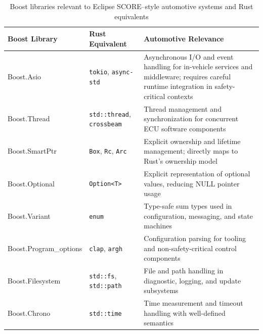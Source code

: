         \begin{table}[h!]
        \centering
        \begin{tabular}{|l|l|p{6cm}|}
        \hline
        \textbf{Boost Library} & \textbf{Rust Equivalent} & \textbf{Automotive Relevance} \\ \hline

        Boost.Asio &
        \texttt{tokio}, \texttt{async-std} &
        Asynchronous I/O and event handling for in-vehicle services and middleware; requires careful runtime integration in safety-critical contexts \\ \hline

        Boost.Thread &
        \texttt{std::thread}, \texttt{crossbeam} &
        Thread management and synchronization for concurrent ECU software components \\ \hline

        Boost.SmartPtr &
        \texttt{Box}, \texttt{Rc}, \texttt{Arc} &
        Explicit ownership and lifetime management; directly maps to Rust’s ownership model \\ \hline

        Boost.Optional &
        \texttt{Option\textless T\textgreater} &
        Explicit representation of optional values, reducing NULL pointer usage \\ \hline

        Boost.Variant &
        \texttt{enum} &
        Type-safe sum types used in configuration, messaging, and state machines \\ \hline

        Boost.Program\_options &
        \texttt{clap}, \texttt{argh} &
        Configuration parsing for tooling and non-safety-critical control components \\ \hline

        Boost.Filesystem &
        \texttt{std::fs}, \texttt{std::path} &
        File and path handling in diagnostic, logging, and update subsystems \\ \hline

        Boost.Chrono &
        \texttt{std::time} &
        Time measurement and timeout handling with well-defined semantics \\ \hline

        \end{tabular}
        \caption{Boost libraries relevant to Eclipse SCORE–style automotive systems and Rust equivalents}
        \label{tab:boost_score_rust}
        \end{table}


